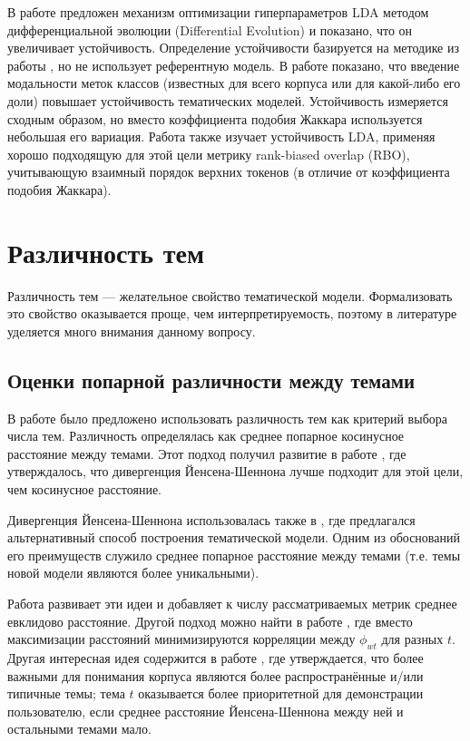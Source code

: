 В работе \cite{agrawal2018wrong} предложен механизм оптимизации гиперпараметров LDA методом дифференциальной эволюции (Differential Evolution) и показано, что он увеличивает устойчивость. Определение устойчивости базируется на методике из работы \cite{greene14howmany}, но не использует референтную модель. В работе \cite{derbanosov} показано, что введение модальности меток классов (известных для всего корпуса или для какой-либо его доли) повышает устойчивость тематических моделей. Устойчивость измеряется сходным образом, но вместо коэффициента подобия Жаккара используется небольшая его вариация. Работа \cite{mantyla2018measuring} также изучает устойчивость LDA, применяя хорошо подходящую для этой цели метрику rank-biased overlap (RBO), учитывающую взаимный порядок верхних токенов (в отличие от  коэффициента подобия Жаккара).

\section{Различность тем}

Различность тем --- желательное свойство тематической модели. Формализовать это свойство оказывается проще, чем интерпретируемость, поэтому в литературе уделяется много внимания данному вопросу.

\subsection{Оценки попарной различности между темами}

В работе \cite{cao2009density} было предложено использовать различность тем как критерий выбора числа тем. Различность определялась как среднее попарное косинусное расстояние между темами. Этот подход получил развитие в работе \cite{deveaud2014accurate}, где утверждалось, что дивергенция Йенсена-Шеннона лучше подходит для этой цели, чем косинусное расстояние.

Дивергенция Йенсена-Шеннона использовалась также в \cite{mimno}, где  предлагался альтернативный способ построения тематической модели. Одним из обоснований его преимуществ служило среднее попарное расстояние между темами (т.е. темы новой модели являются более уникальными).

Работа \cite{tang14look} развивает эти идеи и добавляет к числу рассматриваемых метрик среднее евклидово расстояние. Другой подход можно найти в работе \cite{tan2010topic}, где вместо максимизации расстояний минимизируются корреляции между $\phi_{wt}$ для разных $t$. Другая интересная идея содержится в работе \cite{wang2011topic}, где утверждается, что более важными для понимания корпуса являются более распространённые и/или типичные темы; тема $t$ оказывается более приоритетной для демонстрации пользователю, если среднее расстояние Йенсена-Шеннона между ней и остальными темами мало.

